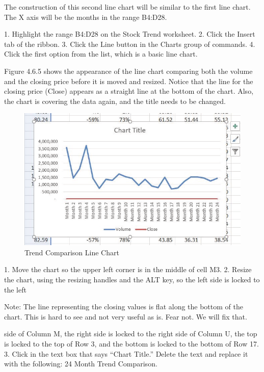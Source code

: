 The construction of this second line chart will be similar to the first line chart. The X axis will be the
months in the range B4:D28.

1.   Highlight the range B4:D28 on the Stock Trend worksheet.
2.   Click the Insert tab of the ribbon.
3.   Click the Line button in the Charts group of commands.
4.   Click the first option from the list, which is a basic line chart.

Figure 4.6.5 shows the appearance of the line chart comparing both the volume and the closing price
before it is moved and resized. Notice that the line for the closing price (Close) appears as a straight
line at the bottom of the chart. Also, the chart is covering the data again, and the title needs to be
changed.


\begin{figure}[H]
	\centering
	\includegraphics[width=\maxwidth{.95\linewidth}]{gfx/ch04_fig09}
	\caption{Trend Comparison Line Chart}
	\label{04:fig09}
\end{figure}





1. Move the chart so the upper left corner is in the middle of cell M3.
2. Resize the chart, using the resizing handles and the ALT key, so the left side is locked to the left




Note: The line representing the closing values is flat along the bottom of the chart. This is hard to see
and not very useful as is. Fear not. We will fix that.





side of Column M, the right side is locked to the right side of Column U, the top is locked to the
top of Row 3, and the bottom is locked to the bottom of Row 17.
3. Click in the text box that says “Chart Title.” Delete the text and replace it with the following: 24
Month Trend Comparison.

